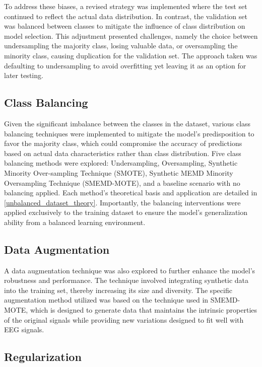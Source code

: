 To address these biases, a revised strategy was implemented where the test set continued to reflect the actual data distribution. In contrast, the validation set was balanced between classes to mitigate the influence of class distribution on model selection. This adjustment presented challenges, namely the choice between undersampling the majority class, losing valuable data, or oversampling the minority class, causing duplication for the validation set. The approach taken was defaulting to undersampling to avoid overfitting yet leaving it as an option for later testing. 

\subsection{Class Balancing}
Given the significant imbalance between the classes in the dataset, various class balancing techniques were implemented to mitigate the model's predisposition to favor the majority class, which could compromise the accuracy of predictions based on actual data characteristics rather than class distribution. Five class balancing methods were explored: Undersampling, Oversampling, Synthetic Minority Over-sampling Technique (SMOTE), Synthetic MEMD Minority Oversampling Technique (SMEMD-MOTE), and a baseline scenario with no balancing applied. Each method's theoretical basis and application are detailed in \autoref{unbalanced_dataset_theory}. Importantly, the balancing interventions were applied exclusively to the training dataset to ensure the model's generalization ability from a balanced learning environment.

\subsection{Data Augmentation}
A data augmentation technique was also explored to further enhance the model's robustness and performance. The technique involved integrating synthetic data into the training set, thereby increasing its size and diversity. The specific augmentation method utilized was based on the technique used in SMEMD-MOTE, which is designed to generate data that maintains the intrinsic properties of the original signals while providing new variations designed to fit well with EEG signals. 



\subsection{Regularization}

